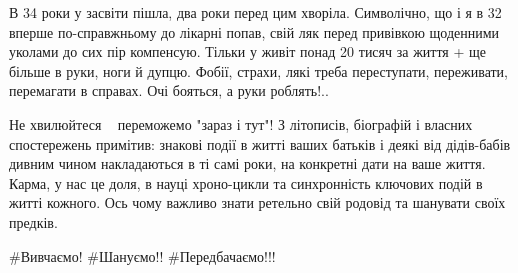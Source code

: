В 34 роки у засвіти пішла, два роки перед цим хворіла. Символічно, що і я в 32
вперше по-справжньому до лікарні попав, свій ляк перед привівкою щоденними
уколами до сих пір компенсую. Тільки у живіт понад 20 тисяч за життя + ще
більше в руки, ноги й дупцю. Фобії, страхи, лякі треба переступати, переживати,
перемагати в справах. Очі бояться, а руки роблять!..

Не хвилюйтеся ~ переможемо "зараз і тут"! З літописів, біографій і власних
спостережень примітив: знакові події в житті ваших батьків і деякі від
дідів-бабів дивним чином накладаються в ті самі роки, на конкретні дати на ваше
життя. Карма, у нас це доля, в науці хроно-цикли та синхронність ключових подій
в житті кожного. Ось чому важливо знати ретельно свій родовід та шанувати своїх
предків. 

\#Вивчаємо!  \#Шануємо!!  \#Передбачаємо!!!
